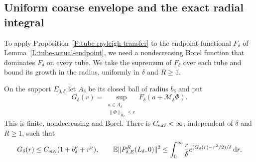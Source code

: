 \subsection{Uniform coarse envelope and the exact radial integral}

To apply Proposition~\ref{P:tube-rayleigh-transfer} to the endpoint functional
$F_\delta$ of Lemma~\ref{L:tube-actual-endpoint}, we need a nondecreasing Borel
function that dominates $F_\delta$ on every tube. We take the supremum of
$F_\delta$ over each tube and bound its growth in the radius, uniformly in
$\delta$ and $R \ge 1$.

\begin{proposition}
  \label{P:tube-coarse-envelope}
  On the support $E_{0,\delta}$ let $A_\delta$ be its closed ball of radius
  $b_\delta$ and put
  \[
    G_\delta(r)=
    \sup_{\substack{a\in A_\delta\\\|\Phi\|_{H_I}\le r}}
    F_\delta(a+\mathcal{M}_\delta\Phi).
  \]
  This is finite, nondecreasing and Borel. There is $C_{\rm env} < \infty$,
  independent of $\delta$ and $R \ge 1$, such that
  \begin{equation}\label{E:tube-coarse-envelope}
    G_\delta(r)\le C_{\rm env}(1+b_\delta^\nu+r^\nu),\qquad
    \mathbb{E}\|P_{\delta,E}^R(L_\delta,0)\|^2
    \le\int_0^\infty\frac r\delta
    e^{(G_\delta(r)-r^2/2)/\delta}\,\mathrm{d} r .
  \end{equation}
\end{proposition}

